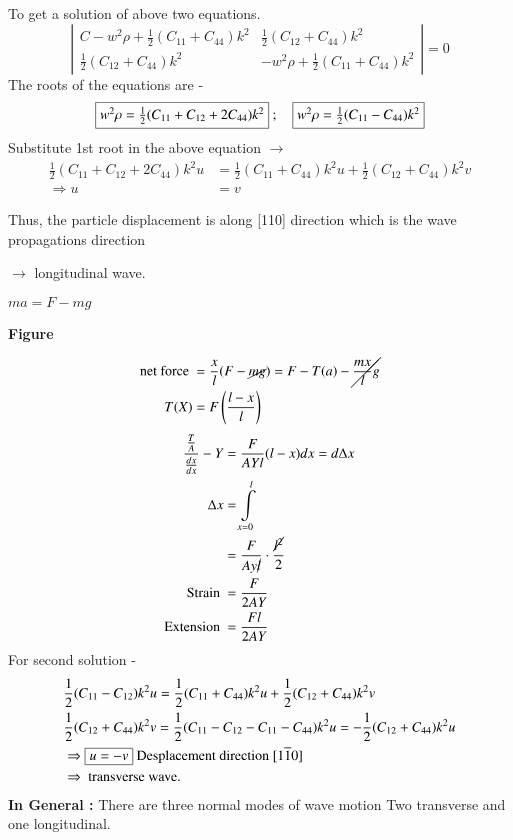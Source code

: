 \smallskip

To get a solution of above two equations.
$$
\left|
\begin{array}{lr}
C-w^{2}\rho+\frac{1}{2}(C_{11}+C_{44})k^{2} & \frac{1}{2}(C_{12}+C_{44})k^{2}\\[5pt]
\frac{1}{2}(C_{12}+C_{44})k^{2} & -w^{2}\rho+\frac{1}{2}(C_{11}+C_{44})k^{2}
\end{array}
\right|=0
$$
The roots of the equations are -
$$
\fbox{$w^{2}\rho =\frac{1}{2}(C_{11}+C_{12}+2C_{44})k^{2}$} \ ;\quad \fbox{$w^{2}\rho=\frac{1}{2}(C_{11}-C_{44})k^{2}$}
$$
Substitute 1st root in the above equation $\to$
\begin{align*}
\frac{1}{2}(C_{11}+C_{12}+2C_{44})k^{2}u &= \frac{1}{2}(C_{11}+C_{44})k^{2}u+\frac{1}{2}(C_{12}+C_{44})k^{2}v\\
\Rightarrow u &= v
\end{align*}

Thus, the particle displacement is along [110] direction which is the wave propagations direction

$\to$ longitudinal wave.

$ma=F-mg$
\begin{center}
{\bf Figure}
\end{center}
\begin{align*}
\text{net force } &= \frac{x}{l}(F-\cancel{mg})=F-T(a)-\cancel{\dfrac{mx}{l}g}\\
T(X) &= F\left(\frac{l-x}{l}\right)
\end{align*}
\begin{align*}
\dfrac{\frac{T}{A}}{\frac{dx}{dx}}-Y &= \dfrac{F}{AYl}(l-x)dx=d\Delta x\\
\Delta x &= \int\limits^{l}_{x=0}\\
&= \frac{F}{Ay\cancel{l}}\cdot \dfrac{\cancel{l^{2}}}{2}\\
\text{Strain } &= \dfrac{F}{2AY}\\
\text{Extension } &= \dfrac{Fl}{2AY}
\end{align*}
For second solution -
\begin{align*}
& \frac{1}{2}(C_{11}-C_{12})k^{2}u=\frac{1}{2}(C_{11}+C_{44})k^{2}u+\frac{1}{2}(C_{12}+C_{44})k^{2}v\\
& \frac{1}{2}(C_{12}+C_{44})k^{2}v=\frac{1}{2}(C_{11}-C_{12}-C_{11}-C_{44})k^{2}u=-\frac{1}{2}(C_{12}+C_{44})k^{2}u\\
&\Rightarrow \fbox{$u=-v$} \text{ Desplacement direction $[1\overline{1}0]$}\\
&\Rightarrow \text{ transverse wave.}
\end{align*}
{\bf In General :} There are three normal modes of wave motion Two transverse and one longitudinal.

